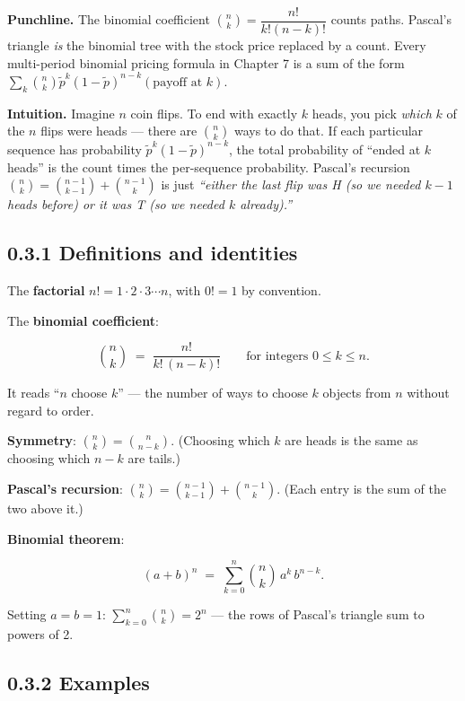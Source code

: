 \documentclass[
  10pt,
  twoside]{book}
\begin{document}
\textbf{Punchline.} The binomial coefficient
\(\binom{n}{k} = \dfrac{n!}{k!(n-k)!}\) counts paths. Pascal's triangle
\emph{is} the binomial tree with the stock price replaced by a count.
Every multi-period binomial pricing formula in Chapter 7 is a sum of the
form
\(\sum_k \binom{n}{k} \tilde p^k (1-\tilde p)^{n-k} (\text{payoff at } k)\).

\textbf{Intuition.} Imagine \(n\) coin flips. To end with exactly \(k\)
heads, you pick \emph{which} \(k\) of the \(n\) flips were heads ---
there are \(\binom{n}{k}\) ways to do that. If each particular sequence
has probability \(\tilde p^k (1-\tilde p)^{n-k}\), the total probability
of ``ended at \(k\) heads'' is the count times the per-sequence
probability. Pascal's recursion
\(\binom{n}{k} = \binom{n-1}{k-1} + \binom{n-1}{k}\) is just
\emph{``either the last flip was H (so we needed \(k-1\) heads before)
or it was T (so we needed \(k\) already).''}

\subsection{0.3.1 Definitions and
identities}\label{definitions-and-identities}

The \textbf{factorial} \(n! = 1 \cdot 2 \cdot 3 \cdots n\), with
\(0! = 1\) by convention.

The \textbf{binomial coefficient}:

\[\binom{n}{k} \;=\; \frac{n!}{k!\,(n-k)!} \qquad \text{for integers } 0 \le k \le n.\]

It reads ``\(n\) choose \(k\)'' --- the number of ways to choose \(k\)
objects from \(n\) without regard to order.

\textbf{Symmetry}: \(\binom{n}{k} = \binom{n}{n-k}\). (Choosing which
\(k\) are heads is the same as choosing which \(n-k\) are tails.)

\textbf{Pascal's recursion}:
\(\binom{n}{k} = \binom{n-1}{k-1} + \binom{n-1}{k}\). (Each entry is the
sum of the two above it.)

\textbf{Binomial theorem}:

\[(a + b)^n \;=\; \sum_{k=0}^{n} \binom{n}{k}\, a^k\, b^{n-k}.\]

Setting \(a = b = 1\): \(\sum_{k=0}^{n} \binom{n}{k} = 2^n\) --- the
rows of Pascal's triangle sum to powers of 2.

\subsection{0.3.2 Examples}\label{examples-2}
\end{document}
